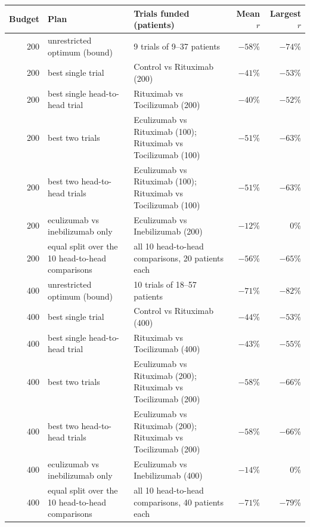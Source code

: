 \begin{tabular}{rlp{6.4cm}rr}
\toprule
Budget & Plan & Trials funded (patients) & Mean $r$ & Largest $r$ \\
\midrule
200 & unrestricted optimum (bound) & 9 trials of 9--37 patients & $-58$\% & $-74$\% \\
200 & best single trial & Control vs Rituximab (200) & $-41$\% & $-53$\% \\
200 & best single head-to-head trial & Rituximab vs Tocilizumab (200) & $-40$\% & $-52$\% \\
200 & best two trials & Eculizumab vs Rituximab (100); Rituximab vs Tocilizumab (100) & $-51$\% & $-63$\% \\
200 & best two head-to-head trials & Eculizumab vs Rituximab (100); Rituximab vs Tocilizumab (100) & $-51$\% & $-63$\% \\
200 & eculizumab vs inebilizumab only & Eculizumab vs Inebilizumab (200) & $-12$\% & 0\% \\
200 & equal split over the 10 head-to-head comparisons & all 10 head-to-head comparisons, 20 patients each & $-56$\% & $-65$\% \\
400 & unrestricted optimum (bound) & 10 trials of 18--57 patients & $-71$\% & $-82$\% \\
400 & best single trial & Control vs Rituximab (400) & $-44$\% & $-53$\% \\
400 & best single head-to-head trial & Rituximab vs Tocilizumab (400) & $-43$\% & $-55$\% \\
400 & best two trials & Eculizumab vs Rituximab (200); Rituximab vs Tocilizumab (200) & $-58$\% & $-66$\% \\
400 & best two head-to-head trials & Eculizumab vs Rituximab (200); Rituximab vs Tocilizumab (200) & $-58$\% & $-66$\% \\
400 & eculizumab vs inebilizumab only & Eculizumab vs Inebilizumab (400) & $-14$\% & 0\% \\
400 & equal split over the 10 head-to-head comparisons & all 10 head-to-head comparisons, 40 patients each & $-71$\% & $-79$\% \\
\bottomrule
\end{tabular}
